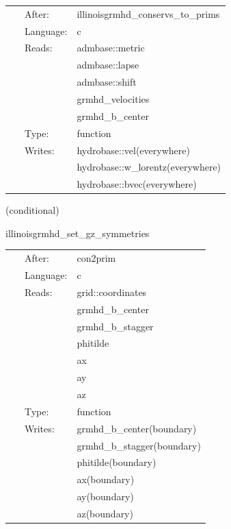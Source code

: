 \documentclass{article}
\begin{document}
 \begin{tabular*}{160mm}{cll} 
~ & After:  & illinoisgrmhd\_conservs\_to\_prims \\ 
~ & Language:  & c \\ 
~ & Reads:  & admbase::metric \\ 
~& ~ &admbase::lapse\\ 
~& ~ &admbase::shift\\ 
~& ~ &grmhd\_velocities\\ 
~& ~ &grmhd\_b\_center\\ 
~ & Type:  & function \\ 
~ & Writes:  & hydrobase::vel(everywhere) \\ 
~& ~ &hydrobase::w\_lorentz(everywhere)\\ 
~& ~ &hydrobase::bvec(everywhere)\\ 
\end{tabular*} 


\vspace{5mm}

   (conditional) 

\hspace{5mm} illinoisgrmhd\_set\_gz\_symmetries 

\hspace{5mm}{\it compute post-initialdata quantities } 


\hspace{5mm}

 \begin{tabular*}{160mm}{cll} 
~ & After:  & con2prim \\ 
~ & Language:  & c \\ 
~ & Reads:  & grid::coordinates \\ 
~& ~ &grmhd\_b\_center\\ 
~& ~ &grmhd\_b\_stagger\\ 
~& ~ &phitilde\\ 
~& ~ &ax\\ 
~& ~ &ay\\ 
~& ~ &az\\ 
~ & Type:  & function \\ 
~ & Writes:  & grmhd\_b\_center(boundary) \\ 
~& ~ &grmhd\_b\_stagger(boundary)\\ 
~& ~ &phitilde(boundary)\\ 
~& ~ &ax(boundary)\\ 
~& ~ &ay(boundary)\\ 
~& ~ &az(boundary)\\ 
\end{tabular*} 
\end{document}
